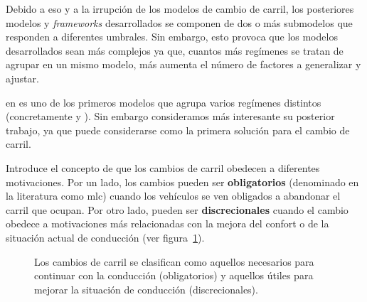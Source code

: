 
Debido a eso y a la irrupción de los modelos de cambio de carril, los posteriores modelos y \textit{frameworks} desarrollados se componen de dos o más submodelos que responden a diferentes umbrales. Sin embargo, esto provoca que los modelos desarrollados sean más complejos ya que, cuantos más regímenes se tratan de agrupar en un mismo modelo, más aumenta el número de factores a generalizar y ajustar.

 en \cite{Gipps1981} es uno de los primeros modelos que agrupa varios regímenes distintos (concretamente \textit{} y \textit{}). Sin embargo consideramos más interesante su posterior trabajo, \cite{Gipps1986} ya que puede considerarse como la primera solución para el cambio de carril.

Introduce el concepto de que los cambios de carril obedecen a diferentes motivaciones. Por un lado, los cambios pueden ser \textbf{obligatorios} (denominado en la literatura como \gls{mlc}) cuando los vehículos se ven obligados a abandonar el carril que ocupan. Por otro lado, pueden ser \textbf{discrecionales} cuando el cambio obedece a motivaciones más relacionadas con la mejora del confort o de la situación actual de conducción (ver figura~\ref{fig:lane-change-mandatory-vs-discretional}).

\begin{figure}
	\caption{Los cambios de carril se clasifican como aquellos necesarios para continuar con la conducción (obligatorios) y aquellos útiles para mejorar la situación de conducción (discrecionales).}
	\label{fig:lane-change-mandatory-vs-discretional}
\end{figure}


